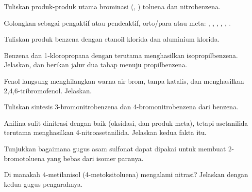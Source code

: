\begin{exercise}[$\star$]\label{exo:b2:aromatic-substitution:2}
Tuliskan produk-produk utama brominasi (, ) toluena dan
nitrobenzena.
\end{exercise}

\begin{exercise}[$\star$]\label{exo:b2:aromatic-substitution:3}
Golongkan sebagai pengaktif atau pendeaktif, orto/para atau meta: ,
, , , , .
\end{exercise}

\begin{exercise}[$\star$]\label{exo:b2:aromatic-substitution:4}
Tuliskan produk benzena dengan etanoil klorida dan aluminium klorida.
\end{exercise}

\begin{exercise}[$\star\star$]\label{exo:b2:aromatic-substitution:5}
Benzena dan 1-kloropropana dengan  terutama menghasilkan
isopropilbenzena. Jelaskan, dan berikan jalur dua tahap menuju
propilbenzena.
\end{exercise}

\begin{exercise}[$\star\star$]\label{exo:b2:aromatic-substitution:6}
Fenol langsung menghilangkan warna air brom, tanpa katalis, dan
menghasilkan 2,4,6-tribromofenol. Jelaskan.
\end{exercise}

\begin{exercise}[$\star\star$]\label{exo:b2:aromatic-substitution:7}
Tuliskan sintesis 3-bromonitrobenzena dan 4-bromonitrobenzena dari benzena.
\end{exercise}

\begin{exercise}[$\star\star$]\label{exo:b2:aromatic-substitution:8}
Anilina sulit dinitrasi dengan baik (oksidasi, dan produk meta), tetapi
asetanilida terutama menghasilkan 4-nitroasetanilida. Jelaskan kedua fakta
itu.
\end{exercise}

\begin{exercise}[$\star\star$]\label{exo:b2:aromatic-substitution:9}
Tunjukkan bagaimana gugus asam sulfonat dapat dipakai untuk membuat 2-bromotoluena yang bebas dari isomer paranya.
\end{exercise}

\begin{exercise}[$\star\star\star$]\label{exo:b2:aromatic-substitution:10}
Di manakah 4-metilanisol (4-metoksitoluena) mengalami nitrasi? Jelaskan
dengan kedua gugus pengarahnya.
\end{exercise}

